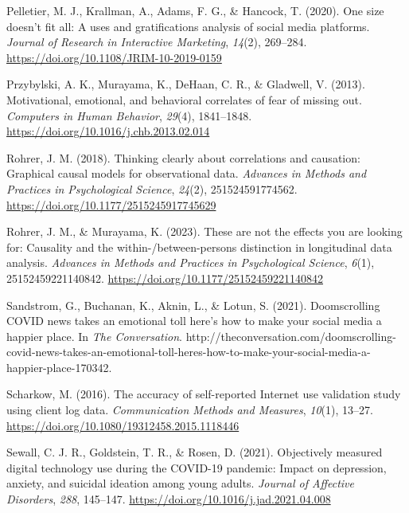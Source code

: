 \documentclass[
  man,mask,floatsintext]{apa7}
\newlength{\cslhangindent}
\newlength{\cslentryspacingunit} %
\newenvironment{CSLReferences}[2] %
 {%
  \setlength{\parindent}{0pt}
  \ifodd #1
  \let\oldpar\par
  \def\par{\hangindent=\cslhangindent\oldpar}
  \fi
  \setlength{\parskip}{#2\cslentryspacingunit}
 }%
 {}
\begin{document}
\begin{CSLReferences}{1}{0}
\leavevmode{}%
Pelletier, M. J., Krallman, A., Adams, F. G., \& Hancock, T. (2020). One size doesn't fit all: A uses and gratifications analysis of social media platforms. \emph{Journal of Research in Interactive Marketing}, \emph{14}(2), 269--284. \url{https://doi.org/10.1108/JRIM-10-2019-0159}

\leavevmode{}%
Przybylski, A. K., Murayama, K., DeHaan, C. R., \& Gladwell, V. (2013). Motivational, emotional, and behavioral correlates of fear of missing out. \emph{Computers in Human Behavior}, \emph{29}(4), 1841--1848. \url{https://doi.org/10.1016/j.chb.2013.02.014}

\leavevmode{}%
Rohrer, J. M. (2018). Thinking clearly about correlations and causation: {Graphical} causal models for observational data. \emph{Advances in Methods and Practices in Psychological Science}, \emph{24}(2), 251524591774562. \url{https://doi.org/10.1177/2515245917745629}

\leavevmode{}%
Rohrer, J. M., \& Murayama, K. (2023). These are not the effects you are looking for: {Causality} and the within-/between-persons distinction in longitudinal data analysis. \emph{Advances in Methods and Practices in Psychological Science}, \emph{6}(1), 25152459221140842. \url{https://doi.org/10.1177/25152459221140842}

\leavevmode{}%
Sandstrom, G., Buchanan, K., Aknin, L., \& Lotun, S. (2021). Doomscrolling {COVID} news takes an emotional toll \textendash{} here's how to make your social media a happier place. In \emph{The Conversation}. http://theconversation.com/doomscrolling-covid-news-takes-an-emotional-toll-heres-how-to-make-your-social-media-a-happier-place-170342.

\leavevmode{}%
Scharkow, M. (2016). The accuracy of self-reported {Internet} use validation study using client log data. \emph{Communication Methods and Measures}, \emph{10}(1), 13--27. \url{https://doi.org/10.1080/19312458.2015.1118446}

\leavevmode{}%
Sewall, C. J. R., Goldstein, T. R., \& Rosen, D. (2021). Objectively measured digital technology use during the {COVID-19} pandemic: {Impact} on depression, anxiety, and suicidal ideation among young adults. \emph{Journal of Affective Disorders}, \emph{288}, 145--147. \url{https://doi.org/10.1016/j.jad.2021.04.008}


\end{CSLReferences}
\end{document}
